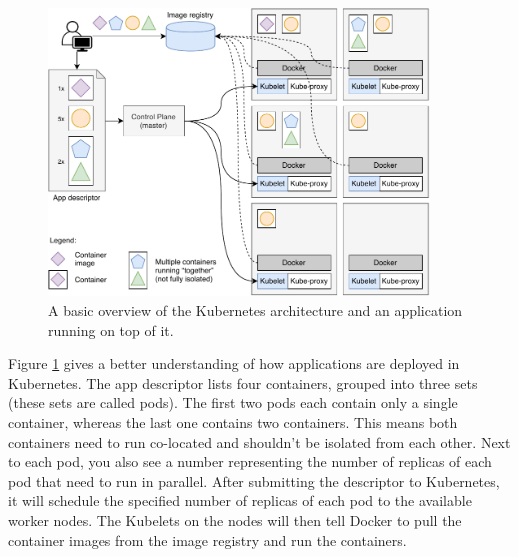 \begin{figure}[tbp]
	\centering
	\includegraphics[width=0.9\textwidth]{images/kubedockeroverview.pdf}
	\caption{A basic overview of the Kubernetes architecture and an application running on top of it.}
	\label{fig:kubedockeroverview}
\end{figure}

Figure \ref{fig:kubedockeroverview} gives a better understanding of how applications are deployed in Kubernetes. The app descriptor lists four containers, grouped into three sets (these sets are called pods). The first two pods each contain only a single container, whereas the last one contains two containers. This means both containers need to run co-located and shouldn't be isolated from each other. Next to each pod, you also see a number representing the number of replicas of each pod that need to run in parallel. After submitting the descriptor to Kubernetes, it will schedule the specified number of replicas of each pod to the available worker nodes. The Kubelets on the nodes will then tell Docker to pull the container images from the image registry and run the containers.


